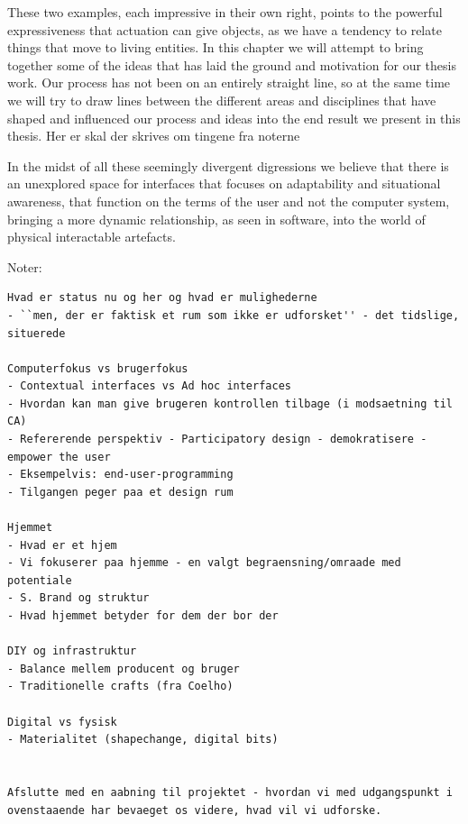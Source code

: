 These two examples, each impressive in their own right, points to the powerful expressiveness that actuation can give objects, as we have a tendency to relate things that move to living entities. 
\blank
In this chapter we will attempt to bring together some of the ideas that has laid the ground and motivation for our thesis work.
Our process has not been on an entirely straight line, so at the same time we will try to draw lines between the different areas and disciplines that have shaped and influenced our process and ideas into the end result we present in this thesis.  
\blank
Her er skal der skrives om tingene fra noterne
\blank
{}

In the midst of all these seemingly divergent digressions we believe that there is an unexplored space for interfaces that focuses on adaptability and situational awareness, that function on the terms of the user and not the computer system, bringing a more dynamic relationship, as seen in software, into the world of physical interactable artefacts.  

Noter:
\begin{verbatim}
Hvad er status nu og her og hvad er mulighederne
- ``men, der er faktisk et rum som ikke er udforsket'' - det tidslige, situerede

Computerfokus vs brugerfokus
- Contextual interfaces vs Ad hoc interfaces
- Hvordan kan man give brugeren kontrollen tilbage (i modsaetning til CA)
- Refererende perspektiv - Participatory design - demokratisere - empower the user
- Eksempelvis: end-user-programming
- Tilgangen peger paa et design rum

Hjemmet
- Hvad er et hjem
- Vi fokuserer paa hjemme - en valgt begraensning/omraade med potentiale
- S. Brand og struktur
- Hvad hjemmet betyder for dem der bor der

DIY og infrastruktur
- Balance mellem producent og bruger
- Traditionelle crafts (fra Coelho)

Digital vs fysisk
- Materialitet (shapechange, digital bits)


Afslutte med en aabning til projektet - hvordan vi med udgangspunkt i ovenstaaende har bevaeget os videre, hvad vil vi udforske.
\end{verbatim}